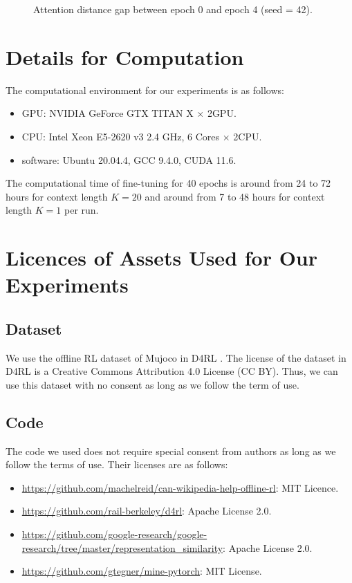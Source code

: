 \documentclass{article}
\begin{document}
\begin{figure}[H]
\begin{minipage}[b]{0.32\linewidth}
    \end{minipage}
    \caption{Attention distance gap between epoch 0 and epoch 4 (seed = 42).}
\end{figure}

\section{Details for Computation}
\label{appendix:details-for-computation}
The computational environment for our experiments is as follows:
\begin{itemize}
    \item GPU: NVIDIA GeForce GTX TITAN X $\times$ 2GPU.
    \item CPU: Intel Xeon E5-2620 v3 2.4 GHz, 6 Cores $\times$ 2CPU.
    \item software: Ubuntu 20.04.4, GCC 9.4.0, CUDA 11.6.
\end{itemize}
The computational time of fine-tuning for 40 epochs is around from 24 to 72 hours for context length $K = 20$ and around from 7 to 48 hours for context length $K = 1$ per run.


\section{Licences of Assets Used for Our Experiments}
\label{appendix:licence}
\subsection{Dataset}
We use the offline RL dataset of Mujoco in D4RL \cite{fu2020d4rl}. The license of the dataset in D4RL is a  Creative Commons Attribution 4.0 License (CC BY). Thus, we can use this dataset with no consent as long as we follow the term of use. 
\subsection{Code}
The code we used does not require special consent from authors as long as we follow the terms of use. Their licenses are as follows:
\begin{itemize}
\item \href{https://github.com/machelreid/can-wikipedia-help-offline-rl}{https://github.com/machelreid/can-wikipedia-help-offline-rl}: MIT Licence.
\item \href{https://github.com/rail-berkeley/d4rl}{https://github.com/rail-berkeley/d4rl}: Apache License 2.0.
\item \href{https://github.com/google-research/google-research/tree/master/representation_similarity}{https://github.com/google-research/google-research/tree/master/representation\_similarity}: Apache License 2.0.
\item \href{https://github.com/gtegner/mine-pytorch}{https://github.com/gtegner/mine-pytorch}: MIT License.
\end{itemize}
\end{document}
